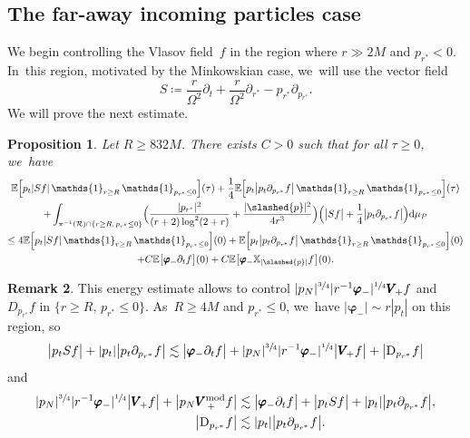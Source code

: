 \documentclass[10pt]{amsart}
\theoremstyle{plain}
\newtheorem{proposition}{Proposition}[section]
\theoremstyle{definition}
\newtheorem{remark}[proposition]{Remark}
\newcommand\T{{\mathbb{X}}}
\newcommand\dr{{\mathrm{d}}}
\begin{document}
\subsection{The far-away incoming particles case}\label{Subsec72}

We begin controlling the Vlasov field~$f$ in the region where $r \gg 2M$ and $p_{r^*} <0$. In~this region, motivated by the Minkowskian case, we~will use the vector field
\[
S \coloneqq \frac{r}{\Omega^2}\partial_t+\frac{r}{\Omega^2}\partial_{r^*}-p_{r^*} \partial_{p_{r^*}}.
\]
We will prove the next estimate.

\begin{proposition}\label{Proestiincoming}
Let $R \geq 832M$. There exists $C >0$ such that for all $\tau \geq 0$, we~have
\begin{multline*}
\mathbb{E} \Bigl[ p_t |Sf| \, \mathds{1}_{r \geq R} \, \mathds{1}_{p_{r^*} \leq 0} \Bigr](\tau)+\frac{1}{4}\mathbb{E} \Bigl[ p_t \big|p_t \partial_{p_{r^*}} f \big| \, \mathds{1}_{r \geq R} \, \mathds{1}_{p_{r^*} \leq 0} \Bigr](\tau) \\
+ \int_{\pi^{-1}(\mathcal{R}) \cap \{ r\geq R, \, p_{r^*} \leq 0 \} } \Bigl(\frac{|p_{r^*}|^2}{(r+2)\log^2(2+r)}+\frac{|\slashed{p}|^2}{4r^3} \Bigr) \Bigl(\big|S f \big| + \frac{1}{4} \big|p_t \partial_{p_{r^*}} f \big| \Bigr) \dr \mu_{\mathcal{P}} \\
\leq 4\mathbb{E} \Bigl[ p_t |Sf| \, \mathds{1}_{r \geq R} \, \mathds{1}_{p_{r^*} \leq 0} \Bigr](0)+\mathbb{E} \Bigl[ p_t \big| p_t \partial_{p_{r^*}} f \big| \, \mathds{1}_{r \geq R} \, \mathds{1}_{p_{r^*} \leq 0} \Bigr](0) \\
+C\mathbb{E} \bigl[ \pmb{\varphi}_- \partial_t f \bigr](0)+ C\mathbb{E} \bigl[ \pmb{\varphi}_- \T_{|\slashed{p}|} f \bigr](0).
\end{multline*}
\end{proposition}
\begin{remark}\label{RkProestiincoming}
This energy estimate allows to control $|p_N|^{\sfrac{3}{4}} |r^{-1} \pmb{\varphi}_-|^{\sfrac{1}{4}} \pmb{V}_{\! +} f$ and $D_{p_{r^*}} f$ in $\{ r \geq R, \, p_{r^*} \leq 0 \}$. As~$R \geq 4M$ and $p_{r^*} \leq 0$, we~have $|\pmb{\varphi}_-| \sim r|p_t|$ on this region, so
\[
\big| p_t S f \big|+ |p_t|\big| p_t \partial_{p_{r^*}} f \big| \lesssim \big| \pmb{ \varphi}_- \partial_t f \big|+ |p_N|^{\sfrac{3}{4}} |r^{-1} \pmb{\varphi}_-|^{\sfrac{1}{4}} \big| \pmb{V}_{\! +} f \big|+\big| \mathrm{D}_{p_{r^*}} f \big|
\]
and
\begin{align*}
|p_N|^{\sfrac{3}{4}} |r^{-1} \pmb{\varphi}_-|^{\sfrac{1}{4}} \big| \pmb{V}_{\! +} f \big|+ \big| p_N \pmb{V}_{\, +}^{ \mathrm{mod}} f \big| & \lesssim \big| \pmb{\varphi}_- \partial_t f \big|+ \big| p_t S f \big|+ |p_t|\big| p_t \partial_{p_{r^*}} f \big|, \\
\big| \mathrm{D}_{p_{r^*}} f \big| & \lesssim |p_t|\big| p_t \partial_{p_{r^*}} f \big|.
\end{align*}
\end{remark}
\end{document}
